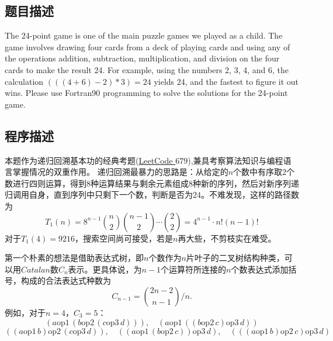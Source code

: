 \subsection{题目描述}
The 24-point game is one of the main puzzle games we played as a child.
The game involves drawing four cards from a deck of playing cards and using any of the operations addition, subtraction, multiplication, and division on the four cards to make the result 24.
For example, using the numbers 2, 3, 4, and 6, the calculation $(((4+6)-2)*3)=24$ yields 24, and the fastest to figure it out wins. Please use Fortran90 programming to solve the solutions for the 24-point game.
\subsection{程序描述}
本题作为递归回溯基本功的经典考题(\href{https://leetcode.com/problems/24-game/description/}{LeetCode $679$}),兼具考察算法知识与编程语言掌握情况的双重作用。
递归回溯最暴力的思路是：从给定的$n$个数中有序取2个数进行四则运算，得到8种运算结果与剩余元素组成8种新的序列，然后对新序列递归调用自身，直到序列中只剩下一个数，判断是否为$24$。不难发现，这样的路径数为
\[
    T_1(n) = 8^{n-1} \binom{n}{2} \binom{n-1}{2}\cdots \binom{2}{2} = 4^{n-1} \cdot n!(n-1)!
\]
对于$T_1(4)=9216$，搜索空间尚可接受，若是$n$再大些，不剪枝实在难受。

第一个朴素的想法是借助表达式树，即$n$个数作为$n$片叶子的二叉树结构种类，可以用$Catalan$数$C_n$表示。更具体说，为$n-1$个运算符所连接的$n$个数表达式添加括号，构成的合法表达式种数为
\[
    C_{n-1}=\binom{2n-2}{n-1} /n.
\]
\newpage
例如，对于$n=4$，$C_3=5$：
\[
    (a \mathbin{\text{op1} \,} (b \mathbin{\text{op2} \,} (c \mathbin{\text{op3} \,} d))), \quad
    (a \mathbin{\text{op1} \,} ((b \mathbin{\text{op2} \,} c) \mathbin{\text{op3} \,} d))
\]
\[
    ((a \mathbin{\text{op1} \,} b) \mathbin{\text{op2} \,} (c \mathbin{\text{op3} \,} d)), \quad
    ((a \mathbin{\text{op1} \,} (b \mathbin{\text{op2} \,} c)) \mathbin{\text{op3} \,} d), \quad
    (((a \mathbin{\text{op1} \,} b) \mathbin{\text{op2} \,} c) \mathbin{\text{op3} \,} d)
\]

\vspace{5pt} %

